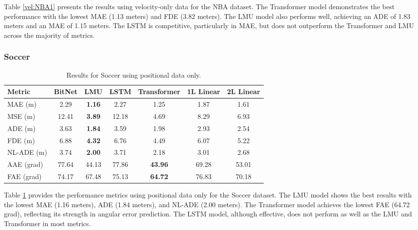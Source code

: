 Table \ref{vel:NBA1} presents the results using velocity-only data for the NBA dataset. The Transformer model demonstrates the best performance with the lowest MAE (1.13 meters) and FDE (3.82 meters). The LMU model also performs well, achieving an ADE of 1.83 meters and an MAE of 1.15 meters. The LSTM is competitive, particularly in MAE, but does not outperform the Transformer and LMU across the majority of metrics.

\subsubsection{Soccer}

\begin{table}[H]
\centering
\caption{Results for Soccer using positional data only.}
\label{pos:SOC1}
\begin{tabular}{l||c|c|c|c|c|c}
Metric & BitNet & LMU & LSTM & Transformer & 1L Linear & 2L Linear \\
\hline \hline
MAE (m) & 2.29 & \textbf{1.16} & 2.27 & 1.25 & 1.87 & 1.61 \\
MSE (m) & 12.41 & \textbf{3.89} & 12.18 & 4.69 & 8.29 & 6.93 \\
ADE (m) & 3.63 & \textbf{1.84} & 3.59 & 1.98 & 2.93 & 2.54 \\
FDE (m) & 6.88 & \textbf{4.32} & 6.76 & 4.49 & 6.07 & 5.22 \\
NL-ADE (m) & 3.74 & \textbf{2.00} & 3.71 & 2.18 & 3.01 & 2.68 \\
AAE (grad) & 77.64 & 44.13 & 77.86 & \textbf{43.96} & 69.28 & 53.01 \\
FAE (grad) & 74.17 & 67.48 & 75.13 & \textbf{64.72} & 76.83 & 70.18 \\
\end{tabular}
\end{table}

Table \ref{pos:SOC1} provides the performance metrics using positional data only for the Soccer dataset. The LMU model shows the best results with the lowest MAE (1.16 meters), ADE (1.84 meters), and NL-ADE (2.00 meters). The Transformer model achieves the lowest FAE (64.72 grad), reflecting its strength in angular error prediction. The LSTM model, although effective, does not perform as well as the LMU and Transformer in most metrics.

